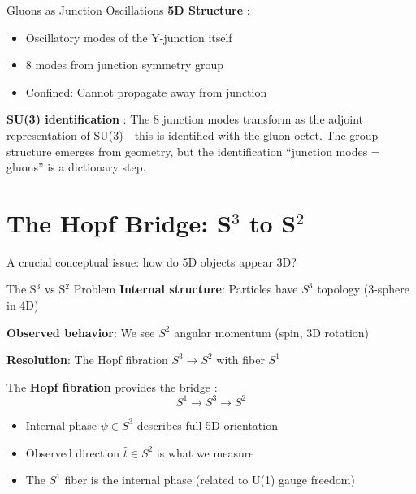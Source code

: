 \begin{mechanism}{Gluons as Junction Oscillations}
\textbf{5D Structure} \tagP{}:
\begin{itemize}[nosep]
\item Oscillatory modes of the Y-junction itself
\item 8 modes from junction symmetry group \tagDer{}
\item Confined: Cannot propagate away from junction
\end{itemize}

\textbf{SU(3) identification} \tagI{}:
The 8 junction modes transform as the adjoint representation of SU(3)---this
is identified with the gluon octet. The group structure emerges from geometry,
but the identification ``junction modes = gluons'' is a dictionary step.
\end{mechanism}

\section{The Hopf Bridge: S$^3$ to S$^2$}
\label{sec:hopf_bridge}

A crucial conceptual issue: how do 5D objects appear 3D?

\begin{statusbox}{The S$^3$ vs S$^2$ Problem}
\textbf{Internal structure}: Particles have $S^3$ topology (3-sphere in 4D)

\textbf{Observed behavior}: We see $S^2$ angular momentum (spin, 3D rotation)

\textbf{Resolution}: The Hopf fibration $S^3 \to S^2$ with fiber $S^1$
\end{statusbox}

The \textbf{Hopf fibration} provides the bridge \tagM{}:
\begin{equation}
S^1 \longrightarrow S^3 \longrightarrow S^2
\end{equation}

\begin{itemize}[nosep]
\item Internal phase $\psi \in S^3$ describes full 5D orientation
\item Observed direction $\hat{t} \in S^2$ is what we measure
\item The $S^1$ fiber is the internal phase (related to U(1) gauge freedom)
\end{itemize}


